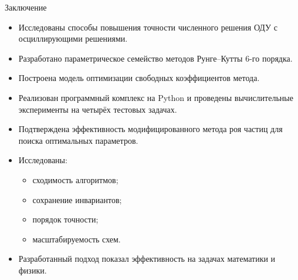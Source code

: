 \begin{frame}{Заключение}
	
	\small
	
	\begin{itemize}
		
		\item Исследованы способы повышения точности
		численного решения ОДУ
		с осциллирующими решениями.
		
			\vspace{0.15cm}
	
	\item Разработано параметрическое семейство
	методов Рунге--Кутты 6-го порядка.
	
	\vspace{0.15cm}
	
	\item Построена модель оптимизации
	свободных коэффициентов метода.
	
	\vspace{0.15cm}
	
	\item Реализован программный комплекс
	на Python и проведены вычислительные эксперименты
	на четырёх тестовых задачах.
	
	\vspace{0.15cm}
	
	\item Подтверждена эффективность
	модифицированного метода роя частиц
	для поиска оптимальных параметров.
	
	\vspace{0.15cm}
	
	\item Исследованы:
	\begin{itemize}
		\item сходимость алгоритмов;
		\item сохранение инвариантов;
		\item порядок точности;
		\item масштабируемость схем.
	\end{itemize}
	
	\vspace{0.15cm}
	
	\item Разработанный подход показал
	эффективность на задачах
	математики и физики.
	
	\end{itemize}
	
\end{frame}